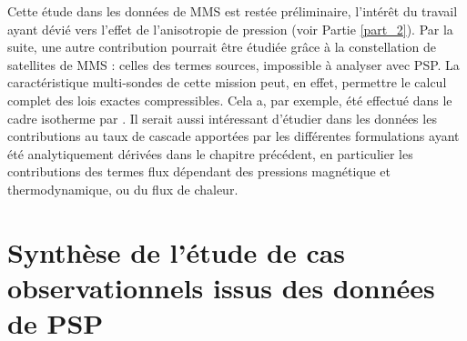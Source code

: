 Cette étude dans les données de \ac{MMS} est restée préliminaire, l'intérêt du travail ayant dévié vers l'effet de l'anisotropie de pression (voir Partie \ref{part_2}). Par la suite, une autre contribution pourrait être étudiée grâce à la constellation de satellites de \ac{MMS} : celles des termes sources, impossible à analyser avec \ac{PSP}. La caractéristique multi-sondes de cette mission peut, en effet, permettre le calcul complet des lois exactes compressibles. Cela a, par exemple, été effectué dans le cadre isotherme par \cite{andres_energy_2019}. Il serait aussi intéressant d'étudier dans les données les contributions au taux de cascade apportées par les différentes formulations ayant été analytiquement dérivées dans le chapitre précédent, en particulier les contributions des termes flux dépendant des pressions magnétique et thermodynamique, ou du flux de chaleur.

\newpage
\section{Synthèse de l'étude de cas observationnels issus des données de \ac{PSP}}
\label{synt-14}

